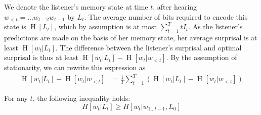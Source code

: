 	We denote the listener's memory state at time $t$, after hearing $w_{<t} = ... w_{t-2} w_{t-1}$ by $L_t$.
	The average number of bits required to encode this state is $\operatorname{H}[L_t]$, which by assumption is at most $\sum_{t=1}^T t I_t$.
	As the listener's predictions are made on the basis of her memory state, her average surprisal is at least $\operatorname{H}[w_t | L_t]$.
	The difference between the listener's surprisal and optimal surprisal is thus at least $\operatorname{H}[w_t | L_t] - \operatorname{H}[w_t | w_{<t}]$.
By the assumption of stationarity, we can rewrite this expression as
\begin{align*}
	\operatorname{H}[w_t | L_t] - \operatorname{H}[w_t | w_{<t}] &=  \frac{1}{T} \sum_{t=1}^{T} \left(\operatorname{H}[w_t | L_t] - \operatorname{H}[w_t | w_{<t}]\right) 
\end{align*}
	\begin{lemma}
For any $t$, the following inequality holds:
	\begin{equation}
H[w_t | L_t] \geq H[w_t|w_{1 \dots t-1}, L_0]
		\end{equation}
	\end{lemma}

